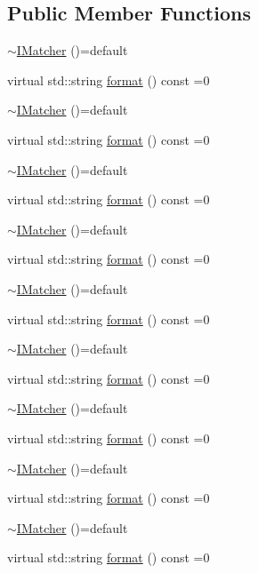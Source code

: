 \subsection*{Public Member Functions}
\begin{DoxyCompactItemize}
\item 
\mbox{\hyperlink{structfakeit_1_1IMatcher_a767959f387f3685ae86e6dc4616fa5cd}{$\sim$\+I\+Matcher}} ()=default
\item 
virtual std\+::string \mbox{\hyperlink{structfakeit_1_1IMatcher_a409d414a042236dc5e05e241dfd24a67}{format}} () const =0
\item 
\mbox{\hyperlink{structfakeit_1_1IMatcher_a767959f387f3685ae86e6dc4616fa5cd}{$\sim$\+I\+Matcher}} ()=default
\item 
virtual std\+::string \mbox{\hyperlink{structfakeit_1_1IMatcher_a409d414a042236dc5e05e241dfd24a67}{format}} () const =0
\item 
\mbox{\hyperlink{structfakeit_1_1IMatcher_a767959f387f3685ae86e6dc4616fa5cd}{$\sim$\+I\+Matcher}} ()=default
\item 
virtual std\+::string \mbox{\hyperlink{structfakeit_1_1IMatcher_a409d414a042236dc5e05e241dfd24a67}{format}} () const =0
\item 
\mbox{\hyperlink{structfakeit_1_1IMatcher_a767959f387f3685ae86e6dc4616fa5cd}{$\sim$\+I\+Matcher}} ()=default
\item 
virtual std\+::string \mbox{\hyperlink{structfakeit_1_1IMatcher_a409d414a042236dc5e05e241dfd24a67}{format}} () const =0
\item 
\mbox{\hyperlink{structfakeit_1_1IMatcher_a767959f387f3685ae86e6dc4616fa5cd}{$\sim$\+I\+Matcher}} ()=default
\item 
virtual std\+::string \mbox{\hyperlink{structfakeit_1_1IMatcher_a409d414a042236dc5e05e241dfd24a67}{format}} () const =0
\item 
\mbox{\hyperlink{structfakeit_1_1IMatcher_a767959f387f3685ae86e6dc4616fa5cd}{$\sim$\+I\+Matcher}} ()=default
\item 
virtual std\+::string \mbox{\hyperlink{structfakeit_1_1IMatcher_a409d414a042236dc5e05e241dfd24a67}{format}} () const =0
\item 
\mbox{\hyperlink{structfakeit_1_1IMatcher_a767959f387f3685ae86e6dc4616fa5cd}{$\sim$\+I\+Matcher}} ()=default
\item 
virtual std\+::string \mbox{\hyperlink{structfakeit_1_1IMatcher_a409d414a042236dc5e05e241dfd24a67}{format}} () const =0
\item 
\mbox{\hyperlink{structfakeit_1_1IMatcher_a767959f387f3685ae86e6dc4616fa5cd}{$\sim$\+I\+Matcher}} ()=default
\item 
virtual std\+::string \mbox{\hyperlink{structfakeit_1_1IMatcher_a409d414a042236dc5e05e241dfd24a67}{format}} () const =0
\item 
\mbox{\hyperlink{structfakeit_1_1IMatcher_a767959f387f3685ae86e6dc4616fa5cd}{$\sim$\+I\+Matcher}} ()=default
\item 
virtual std\+::string \mbox{\hyperlink{structfakeit_1_1IMatcher_a409d414a042236dc5e05e241dfd24a67}{format}} () const =0
\end{DoxyCompactItemize}


